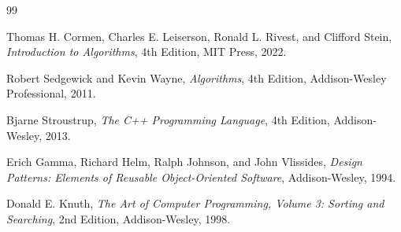 \begin{thebibliography}{99}

Thomas H. Cormen, Charles E. Leiserson, Ronald L. Rivest, and Clifford Stein,
\textit{Introduction to Algorithms}, 4th Edition, MIT Press, 2022.

Robert Sedgewick and Kevin Wayne,
\textit{Algorithms}, 4th Edition, Addison-Wesley Professional, 2011.

Bjarne Stroustrup,
\textit{The C++ Programming Language}, 4th Edition, Addison-Wesley, 2013.

Erich Gamma, Richard Helm, Ralph Johnson, and John Vlissides,
\textit{Design Patterns: Elements of Reusable Object-Oriented Software}, Addison-Wesley, 1994.

Donald E. Knuth,
\textit{The Art of Computer Programming, Volume 3: Sorting and Searching}, 2nd Edition, Addison-Wesley, 1998.

\end{thebibliography}
